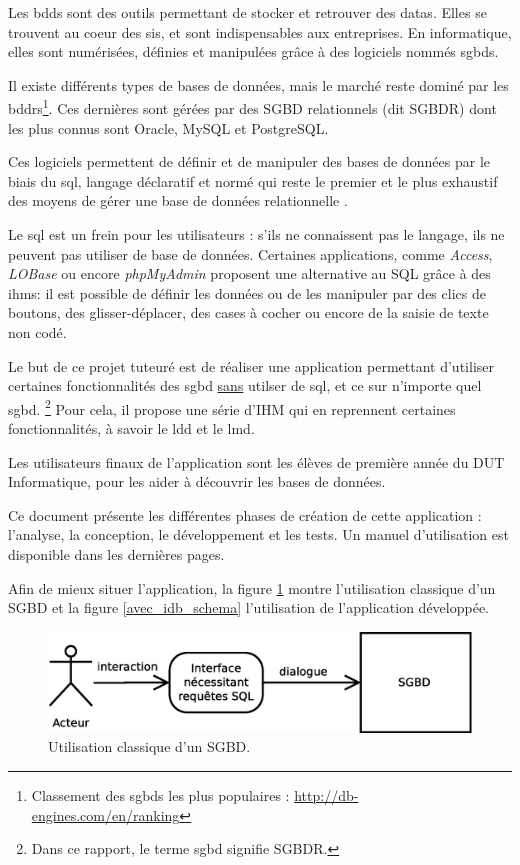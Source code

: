 Les \glspl{bdd} sont des outils permettant de stocker et retrouver des \glspl{data}. 
Elles se trouvent au coeur des \glspl{si}, et sont indispensables aux entreprises.
En informatique, elles sont numérisées, définies et manipulées grâce à des logiciels nommés \glspl{sgbd}.

Il existe différents types de bases de données, mais le marché reste dominé par les \glspl{bddr}\footnote{\label{part_de_marché_relationnel}
Classement des \glspl{sgbd} les plus populaires : \url{http://db-engines.com/en/ranking}}.
Ces dernières sont gérées par des SGBD relationnels (dit SGBDR) 
dont les plus connus sont Oracle, MySQL et PostgreSQL.

Ces logiciels permettent de définir et de manipuler des bases de données par le biais du \gls{sql}, 
langage déclaratif et normé qui reste le premier et le plus exhaustif des moyens de gérer une base de données relationnelle .

Le \gls{sql} est un frein pour les utilisateurs : s'ils ne connaissent pas le langage, ils ne peuvent pas utiliser de base de données.
Certaines applications, comme \textit{Access}, \textit{LOBase} ou encore \textit{phpMyAdmin} proposent une alternative au SQL grâce à des 
\glspl{ihm}: il est possible de définir les données ou de les manipuler par des clics de boutons, des glisser-déplacer, des cases à cocher ou encore de la saisie
de texte non codé. 

Le but de ce projet tuteuré est de réaliser une application permettant d'utiliser certaines fonctionnalités des
\gls{sgbd} \underline{sans} 
utilser de \gls{sql}, et ce sur n'importe quel \gls{sgbd}.
\footnote{\label{sgbd_et_sgbdr}Dans ce rapport, le terme \gls{sgbd} signifie SGBDR.}
Pour cela, il propose une série d'IHM qui en reprennent certaines fonctionnalités,
à savoir le \gls{ldd} et le \gls{lmd}.

Les utilisateurs finaux de l'application sont les élèves de première année du DUT Informatique, pour
les aider à découvrir les bases de données.

Ce document présente les différentes phases de création de cette application : l'analyse, la conception, le développement et les tests.
Un manuel d'utilisation est disponible dans les dernières pages.

Afin de mieux situer l'application, la figure \ref{sans_idb_schema} montre l'utilisation classique d'un SGBD et 
la figure \ref{avec_idb_schema} l'utilisation de l'application développée.

\begin{figure}[!h]
  \centering
  \includegraphics[width=14cm]{images/sans_idb.eps}
  \caption{Utilisation classique d'un SGBD.}
  \label{sans_idb_schema}
\end{figure}

